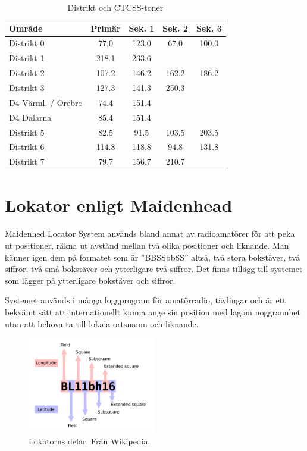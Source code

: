 \begin{table}[H]
\centering
\begin{tabular}{lcccc}
	\textbf{Område}    & \textbf{Primär} & \textbf{Sek. 1} & \textbf{Sek. 2} & \textbf{Sek. 3} \\ \hline
	Distrikt 0         & 77,0            & 123.0           & 67.0            & 100.0           \\
	Distrikt 1         & 218.1           & 233.6           &                 &                 \\
	Distrikt 2         & 107.2           & 146.2           & 162.2           & 186.2           \\
	Distrikt 3         & 127.3           & 141.3           & 250.3           &                 \\
	D4 Värml. / Örebro & 74.4            & 151.4           &                 &                 \\
	D4 Dalarna         & 85.4            & 151.4           &                 &                 \\
	Distrikt 5         & 82.5            & 91.5            & 103.5           & 203.5           \\
	Distrikt 6         & 114.8           & 118,8           & 94.8            & 131.8           \\
	Distrikt 7         & 79.7            & 156.7           & 210.7           &
\end{tabular}
\caption{Distrikt och CTCSS-toner}
\end{table}

\section{Lokator enligt Maidenhead}

Maidenhed Locator System används bland annat av radioamatörer för att peka ut
positioner, räkna ut avstånd mellan två olika positioner och liknande. Man
känner igen dem på formatet som är ''BBSSbbSS'' altså, två stora bokstäver,
två siffror, två små bokstäver och ytterligare två siffror. Det finns tillägg
till systemet som lägger på ytterligare bokstäver och siffror.

Systemet används i många loggprogram för amatörradio, tävlingar och är ett
bekvämt sätt att internationellt kunna ange sin position med lagom noggrannhet
utan att behöva ta till lokala ortsnamn och liknande.

\begin{figure}[h]
	\centering
	\includegraphics[width=0.5\textwidth]{pic/lokator.png}
	\caption{Lokatorns delar. Från Wikipedia.}
\end{figure}

